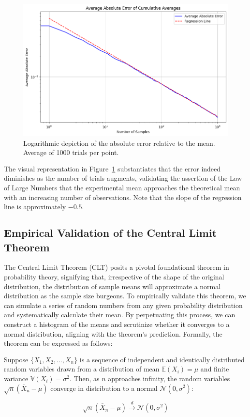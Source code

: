 \documentclass{article}
\begin{document}
\begin{figure}[H]
	\centering
	\includegraphics[width=0.5\linewidth]{./Figures/LLN/verifloglog.png}
	\caption{Logarithmic depiction of the absolute error relative to the mean. Average of 1000 trials per point.}
	\label{fig:verificationllnlog}
\end{figure}

The visual representation in Figure~\ref{fig:verificationllnlog} substantiates that the error indeed diminishes as the number of trials augments, validating the assertion of the Law of Large Numbers that the experimental mean approaches the theoretical mean with an increasing number of observations. Note that the slope of the regression line is approximately \(-0.5\).

\subsection{Empirical Validation of the Central Limit Theorem}
\label{sec:clt}

The Central Limit Theorem (CLT) posits a pivotal foundational theorem in probability theory, signifying that, irrespective of the shape of the original distribution, the distribution of sample means will approximate a normal distribution as the sample size burgeons. To empirically validate this theorem, we can simulate a series of random numbers from any given probability distribution and systematically calculate their mean. By perpetuating this process, we can construct a histogram of the means and scrutinize whether it converges to a normal distribution, aligning with the theorem's prediction. Formally, the theorem can be expressed as follows:

\begin{theorem}
	Suppose \(\{X_1, X_2, ..., X_n\}\) is a sequence of independent and identically distributed random variables drawn from a distribution of mean \(\mathbb{E}(X_i) = \mu\) and finite variance \(\mathbb{V}(X_i) = \sigma^2\). Then, as \(n\) approaches infinity, the random variables \(\sqrt{n}(\bar{X}_n - \mu)\) converge in distribution to a normal \(\mathcal{N}(0, \sigma^2)\):

	\begin{equation}
		\sqrt{n}(\bar{X}_n - \mu) \xrightarrow{d} \mathcal{N}(0, \sigma^2)
	\end{equation}
\end{theorem}
\end{document}
